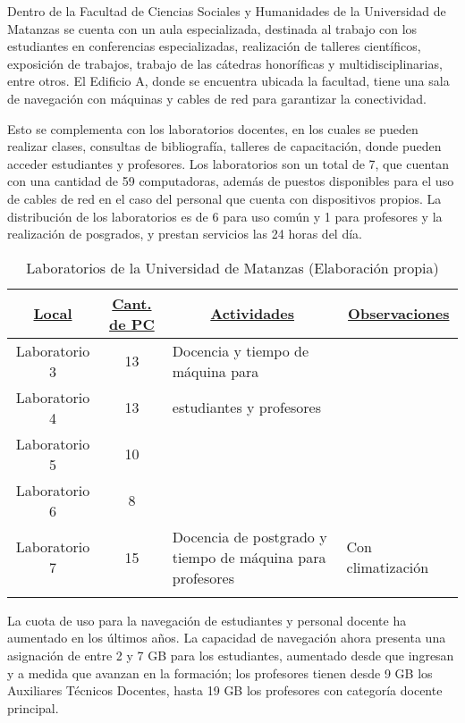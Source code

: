 Dentro de la Facultad de Ciencias Sociales y Humanidades de la Universidad de Matanzas se cuenta con un aula especializada, destinada al trabajo con los estudiantes en conferencias especializadas, realización de talleres científicos, exposición de trabajos, trabajo de las cátedras honoríficas y multidisciplinarias, entre otros. El Edificio A, donde se encuentra ubicada la facultad, tiene una sala de navegación con máquinas y cables de red para garantizar la conectividad.

Esto se complementa con los laboratorios docentes, en los cuales se pueden realizar clases, consultas de bibliografía, talleres de capacitación, donde pueden acceder estudiantes y profesores. Los laboratorios son un total de 7, que cuentan con una cantidad de 59 computadoras, además de puestos disponibles para el uso de cables de red en el caso del personal que cuenta con dispositivos propios. La distribución de los laboratorios es de 6 para uso común y 1 para profesores y la realización de posgrados, y prestan servicios las 24 horas del día. 

\begin{longtable}{|c|c|p{8cm}|p{4cm}|}
\hline
\underline{\textbf{Local}}	&  \underline{\textbf{Cant. de PC}} & \multicolumn{1}{c}{\underline{\textbf{Actividades}}} & \multicolumn{1}{|c|}{\underline{\textbf{Observaciones}}} \\ \hline
Laboratorio 3	& 13 & Docencia y tiempo de máquina para & \\ \cline{1-2} \cline{4-4}
Laboratorio 4	& 13 &  estudiantes y profesores & \\ \cline{1-2} \cline{4-4}
Laboratorio 5	& 10 & & \\ \cline{1-2} \cline{4-4}
Laboratorio 6	& 8 & & \\ \hline
Laboratorio 7	& 15 & Docencia de postgrado y tiempo de máquina para profesores & Con climatización \\ \hline
	\caption{Laboratorios de la Universidad de Matanzas (Elaboración propia)}
\end{longtable}

La cuota de uso para la navegación de estudiantes y personal docente ha aumentado en los últimos años. La capacidad de navegación ahora presenta una asignación de entre 2 y 7 GB para los estudiantes, aumentado desde que ingresan y a medida que avanzan en la formación; los profesores tienen desde 9 GB los Auxiliares Técnicos Docentes, hasta 19 GB los profesores con categoría docente principal.


